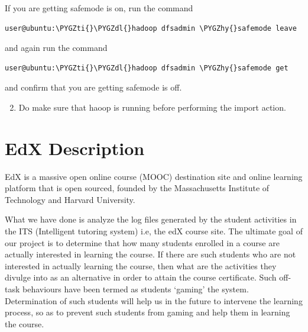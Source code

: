 \documentclass[a4paper,12pt,oneside]{sphinxmanual}
\def\PYGZdl{\char`\$}
\def\PYGZhy{\char`\-}
\def\PYGZti{\char`\~}
\begin{document}
If you are getting safemode is on, run the command

\begin{Verbatim}[commandchars=\\\{\}]
user@ubuntu:\PYGZti{}\PYGZdl{}hadoop dfsadmin \PYGZhy{}safemode leave
\end{Verbatim}

and again run the command

\begin{Verbatim}[commandchars=\\\{\}]
user@ubuntu:\PYGZti{}\PYGZdl{}hadoop dfsadmin \PYGZhy{}safemode get
\end{Verbatim}

and confirm that you are getting safemode is off.
\begin{enumerate}
\setcounter{enumi}{1}
\item {} 
Do make sure that haoop is running before performing the import action.

\end{enumerate}


\chapter{EdX Description}
\label{document:edx-description}
EdX is a massive open online course (MOOC) destination site and online learning platform that is open sourced, founded by the Massachusetts Institute of Technology and Harvard University.

What we have done is analyze the log files generated by the student activities in the ITS (Intelligent tutoring system) i.e, the edX course site. The ultimate goal of our project is to determine that how many students enrolled in a course are actually interested in learning the course. If there are such students who are not interested in actually learning the course, then what are the activities they divulge into as an alternative in order to attain the course certificate. Such off-task behaviours have been termed as students `gaming' the system. Determination of such students will help us in the future to intervene the learning process, so as to prevent such students from gaming and help them in learning the course.
\end{document}
